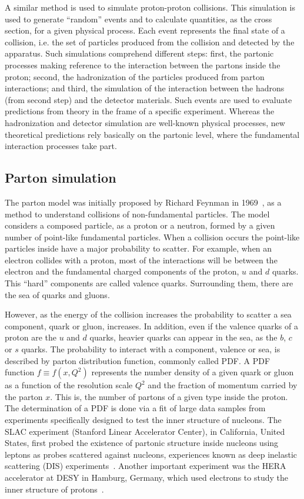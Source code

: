 A similar method is used to simulate proton-proton collisions. This simulation is used to generate ``random'' events and to calculate quantities, as the cross section, for a given physical process. Each event represents the final state of a collision, i.e. the set of particles produced from the collision and detected by the apparatus. Such simulations comprehend different steps: first, the partonic processes making reference to the interaction between the partons inside the proton; second, the hadronization of the particles produced from parton interactions; and third, the simulation of the interaction between the hadrons (from second step) and the detector materials. Such events are used to evaluate predictions from theory in the frame of a specific experiment. Whereas the hadronization and detector simulation are well-known physical processes, new theoretical predictions rely basically on the partonic level, where the fundamental interaction processes take part.

\subsection{Parton simulation}
\label{sec:parton}

The parton model was initially proposed by Richard Feynman in 1969~\cite{Feynman:1969ej}, as a method to understand collisions of non-fundamental particles. The model considers a composed particle, as a proton or a neutron, formed by a given number of point-like fundamental particles. When a collision occurs the point-like particles inside have a major probability to scatter. For example, when an electron collides with a proton, most of the interactions will be between the electron and the fundamental charged components of the proton, $u$ and $d$ quarks. This ``hard'' components are called valence quarks. Surrounding them, there are the sea of quarks and gluons.

However, as the energy of the collision increases the probability to scatter a sea component, quark or gluon, increases. In addition, even if the valence quarks of a proton are the $u$ and $d$ quarks, heavier quarks can appear in the sea, as the $b$, $c$ or $s$ quarks. The probability to interact with a component, valence or sea, is described by parton distribution function, commonly called PDF. A PDF function $f\equiv f(x,Q^{2})$ represents the number density of a given quark or gluon as a function of the resolution scale $Q^{2}$ and the fraction of momentum carried by the parton $x$. This is, the number of partons of a given type inside the proton. The determination of a PDF is done via a fit of large data samples from experiments specifically designed to test the inner structure of nucleons. The SLAC experiment (Stanford Linear Accelerator Center), in California, United States, first probed the existence of partonic structure inside nucleons using leptons as probes scattered against nucleons, experiences known as deep inelastic scattering (DIS) experiments~\cite{Prescott:1996di}. Another important experiment was the HERA accelerator at DESY in Hamburg, Germany, which used electrons to study the inner structure of protons~\cite{Basu:1997ga}.

